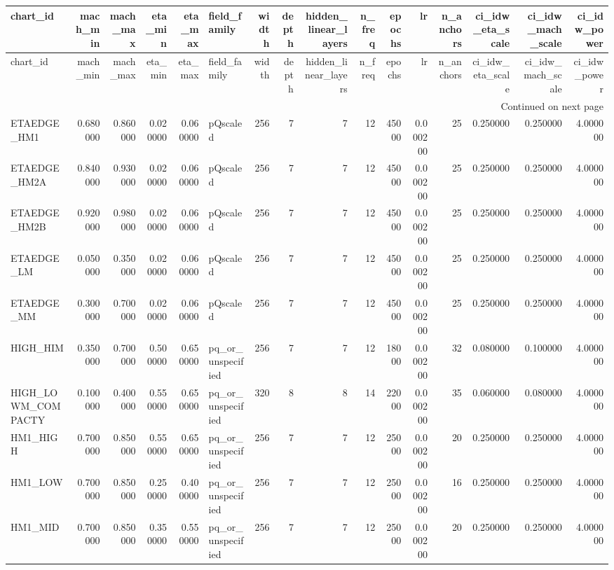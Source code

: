 \begin{longtable}{lrrrrlrrrrrrrrrr}
\toprule
chart_id & mach_min & mach_max & eta_min & eta_max & field_family & width & depth & hidden_linear_layers & n_freq & epochs & lr & n_anchors & ci_idw_eta_scale & ci_idw_mach_scale & ci_idw_power \\
\midrule
\endfirsthead
\toprule
chart_id & mach_min & mach_max & eta_min & eta_max & field_family & width & depth & hidden_linear_layers & n_freq & epochs & lr & n_anchors & ci_idw_eta_scale & ci_idw_mach_scale & ci_idw_power \\
\midrule
\endhead
\midrule
\multicolumn{16}{r}{Continued on next page} \\
\midrule
\endfoot
\bottomrule
\endlastfoot
ETAEDGE_HM1 & 0.680000 & 0.860000 & 0.020000 & 0.060000 & pQscaled & 256 & 7 & 7 & 12 & 45000 & 0.000200 & 25 & 0.250000 & 0.250000 & 4.000000 \\
ETAEDGE_HM2A & 0.840000 & 0.930000 & 0.020000 & 0.060000 & pQscaled & 256 & 7 & 7 & 12 & 45000 & 0.000200 & 25 & 0.250000 & 0.250000 & 4.000000 \\
ETAEDGE_HM2B & 0.920000 & 0.980000 & 0.020000 & 0.060000 & pQscaled & 256 & 7 & 7 & 12 & 45000 & 0.000200 & 25 & 0.250000 & 0.250000 & 4.000000 \\
ETAEDGE_LM & 0.050000 & 0.350000 & 0.020000 & 0.060000 & pQscaled & 256 & 7 & 7 & 12 & 45000 & 0.000200 & 25 & 0.250000 & 0.250000 & 4.000000 \\
ETAEDGE_MM & 0.300000 & 0.700000 & 0.020000 & 0.060000 & pQscaled & 256 & 7 & 7 & 12 & 45000 & 0.000200 & 25 & 0.250000 & 0.250000 & 4.000000 \\
HIGH_HIM & 0.350000 & 0.700000 & 0.500000 & 0.650000 & pq_or_unspecified & 256 & 7 & 7 & 12 & 18000 & 0.000200 & 32 & 0.080000 & 0.100000 & 4.000000 \\
HIGH_LOWM_COMPACTY & 0.100000 & 0.400000 & 0.550000 & 0.650000 & pq_or_unspecified & 320 & 8 & 8 & 14 & 22000 & 0.000200 & 35 & 0.060000 & 0.080000 & 4.000000 \\
HM1_HIGH & 0.700000 & 0.850000 & 0.550000 & 0.650000 & pq_or_unspecified & 256 & 7 & 7 & 12 & 25000 & 0.000200 & 20 & 0.250000 & 0.250000 & 4.000000 \\
HM1_LOW & 0.700000 & 0.850000 & 0.250000 & 0.400000 & pq_or_unspecified & 256 & 7 & 7 & 12 & 25000 & 0.000200 & 16 & 0.250000 & 0.250000 & 4.000000 \\
HM1_MID & 0.700000 & 0.850000 & 0.350000 & 0.550000 & pq_or_unspecified & 256 & 7 & 7 & 12 & 25000 & 0.000200 & 20 & 0.250000 & 0.250000 & 4.000000 \\

\end{longtable}
